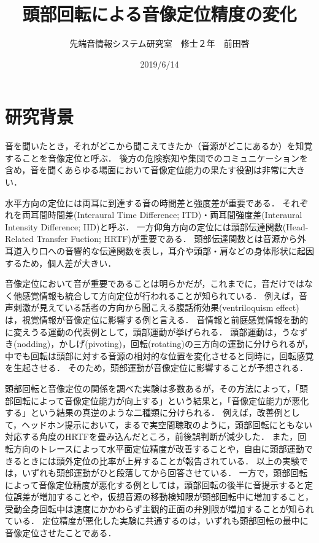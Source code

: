 \documentclass[12pt,a4j]{jsarticle}
\title{頭部回転による音像定位精度の変化}
\author{先端音情報システム研究室　修士２年　前田啓}
\date{2019/6/14}
\renewcommand{\ }{\hspace{1zw}}
\begin{document}
\maketitle
\section{研究背景}
音を聞いたとき，それがどこから聞こえてきたか（音源がどこにあるか）を知覚することを音像定位と呼ぶ．
後方の危険察知や集団でのコミュニケーションを含め，音を聞くあらゆる場面において音像定位能力の果たす役割は非常に大きい．

水平方向の定位には両耳に到達する音の時間差と強度差が重要である．
それぞれを両耳間時間差(Interaural Time Difference; ITD)・両耳間強度差(Interaural Intensity Difference; IID)と呼ぶ．
一方仰角方向の定位には頭部伝達関数(Head-Related Transfer Fuction; HRTF)が重要である．
頭部伝達関数とは音源から外耳道入り口への音響的な伝達関数を表し，耳介や頭部・肩などの身体形状に起因するため，個人差が大きい．

音像定位において音が重要であることは明らかだが，これまでに，音だけではなく他感覚情報も統合して方向定位が行われることが知られている．
例えば，音声刺激が見えている話者の方向から聞こえる腹話術効果(ventriloquism effect)は，視覚情報が音像定位に影響する例と言える．
音情報と前庭感覚情報を動的に変えうる運動の代表例として，頭部運動が挙げられる．
頭部運動は，うなずき(nodding)，かしげ(pivoting)，回転(rotating)の三方向の運動に分けられるが，中でも回転は頭部に対する音源の相対的な位置を変化させると同時に，回転感覚を生起させる．
そのため，頭部運動が音像定位に影響することが予想される．

頭部回転と音像定位の関係を調べた実験は多数あるが，その方法によって，「頭部回転によって音像定位能力が向上する」という結果と，「音像定位能力が悪化する」という結果の真逆のような二種類に分けられる．
例えば，改善例として，ヘッドホン提示において，まるで実空間聴取のように，頭部回転にともない対応する角度のHRTFを畳み込んだところ，前後誤判断が減少した\cite{Kawaura}．
また，回転方向のトレースによって水平面定位精度が改善すること\cite{Iwaya}や，自由に頭部運動できるときには頭外定位の比率が上昇すること\cite{Brimijoin}が報告されている．
以上の実験では，いずれも頭部運動がひと段落してから回答させている．
一方で，頭部回転によって音像定位精度が悪化する例としては，頭部回転の後半に音提示すると定位誤差が増加すること\cite{Cooper}や，仮想音源の移動検知限が頭部回転中に増加すること\cite{Honda}，受動全身回転中は速度にかかわらず主観的正面の弁別限が増加すること\cite{Masumi}\cite{Tsuno}が知られている．
定位精度が悪化した実験に共通するのは，いずれも頭部回転の最中に音像定位させたことである．
\end{document}

